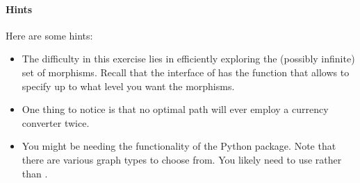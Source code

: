 \paragraph{Hints}
Here are some hints:
\begin{itemize}
    \item The difficulty in this exercise lies in efficiently exploring the (possibly infinite) set of morphisms.
          Recall that the interface of  has the function  that allows to specify up to what level you want the morphisms.

    \item  One thing to notice is that no optimal path will ever employ a currency converter twice.

    \item  You might be needing the functionality of the  Python package. Note that there are various graph types to choose from.
          You likely need to use  rather than .
\end{itemize}
